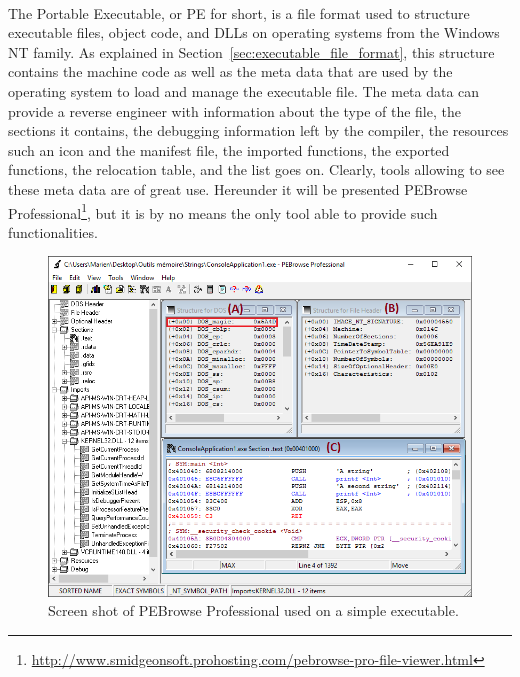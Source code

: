 \paragraph{}
The Portable Executable, or PE for short, is a file format used to structure executable files, object code, and DLLs on operating systems from the Windows NT family. As explained in Section~\ref{sec:executable_file_format}, this structure contains the machine code as well as the meta data that are used by the operating system to load and manage the executable file. The meta data can provide a reverse engineer with information about the type of the file, the sections it contains, the debugging information left by the compiler, the resources such an icon and the manifest file, the imported functions, the exported functions, the relocation table, and the list goes on. Clearly, tools allowing to see these meta data are of great use. Hereunder it will be presented PEBrowse Professional\footnote{\url{http://www.smidgeonsoft.prohosting.com/pebrowse-pro-file-viewer.html}}, but it is by no means the only tool able to provide such functionalities.


\begin{figure}[!htb]
	\centering
	\includegraphics[width=1\textwidth]{reverse_engineering/pebrowse_professional_annotated.png}
	\caption{Screen shot of PEBrowse Professional used on a simple executable.}
	\label{fig:pebrowse_professional}
\end{figure}

